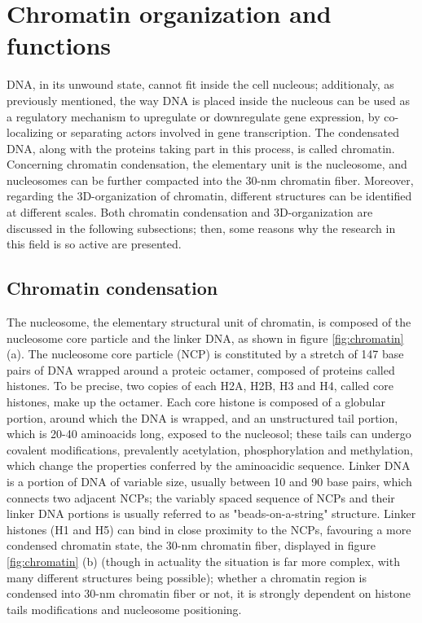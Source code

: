 \section{Chromatin organization and functions}

DNA, in its unwound state, cannot fit inside the cell nucleous; additionaly, as previously mentioned, the way DNA is placed inside the nucleous can be used as a regulatory mechanism to upregulate or downregulate gene expression, by co-localizing or separating actors involved in gene transcription. The condensated DNA, along with the proteins taking part in this process, is called chromatin. Concerning chromatin condensation, the elementary unit is the nucleosome\cite{chromatinstructure2018}, and nucleosomes can be further compacted into the 30-nm chromatin fiber\cite{chromatinfiber2015}. Moreover, regarding the 3D-organization of chromatin, different structures can be identified at different scales\cite{chromatinorganization2019}. Both chromatin condensation and 3D-organization are discussed in the following subsections; then, some reasons why the research in this field is so active are presented. 

\subsection{Chromatin condensation}
The nucleosome, the elementary structural unit of chromatin, is composed of the nucleosome core particle and the linker DNA, as shown in figure \ref{fig:chromatin} (a). The nucleosome core particle (NCP) is constituted by a stretch of 147 base pairs of DNA wrapped around a proteic octamer, composed of proteins called histones. To be precise, two copies of each H2A, H2B, H3 and H4, called core histones, make up the octamer\cite{nucleosomecore1997}. Each core histone is composed of a globular portion, around which the DNA is wrapped, and an unstructured tail portion, which is 20-40 aminoacids long, exposed to the nucleosol; these tails can undergo covalent modifications, prevalently acetylation, phosphorylation and methylation, which change the properties conferred by the aminoacidic sequence\cite{histonemodifications2020}. Linker DNA is a portion of DNA of variable size, usually between 10 and 90 base pairs, which connects two adjacent NCPs; the variably spaced sequence of NCPs and their linker DNA portions is usually referred to as "beads-on-a-string" structure. Linker histones (H1 and H5) can bind in close proximity to the NCPs, favouring a more condensed chromatin state, the 30-nm chromatin fiber, displayed in figure \ref{fig:chromatin} (b) (though in actuality the situation is far more complex, with many different structures being possible); whether a chromatin region is condensed into 30-nm chromatin fiber or not, it is strongly dependent on histone tails modifications and nucleosome positioning\cite{chromatinfiber2015}.

